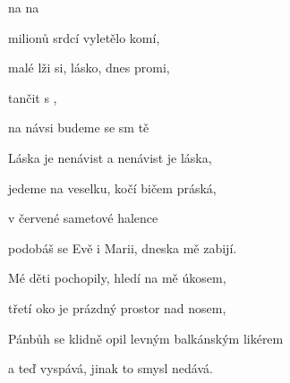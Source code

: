 
\zr

  na   na             

\kr
\zs

 milionů srdcí vyletělo komí,

 malé lži si, lásko, dnes promi,

 tančit s ,

na návsi  budeme se sm  tě 

\ks

\zr   \kr

\zs

Láska je nenávist a nenávist je láska,

jedeme na veselku, kočí bičem práská,

v červené sametové halence

podobáš se Evě i Marii, dneska mě zabijí.

\ks

\zr   \kr

\zs

Mé děti pochopily, hledí na mě úkosem,

třetí oko je prázdný prostor nad nosem,

Pánbůh se klidně opil levným balkánským likérem

a teď vyspává, jinak to smysl nedává.

\ks

\zr
\kr

\kp




